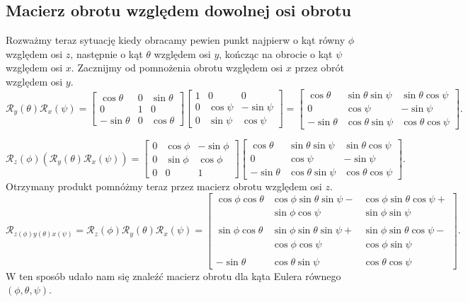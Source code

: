\documentclass[a4paper,twoside,11pt,reqno]{mwrep}
\theoremstyle{plain} \newtheorem{twr}{Twierdzenie}
\theoremstyle{plain} \newtheorem{lem}{Lemat}
\theoremstyle{definition} \newtheorem{defi}{Definicja}
\theoremstyle{remark} \newtheorem*{wni}{Wniosek}
\theoremstyle{definition} \newtheorem{uwaga}{Uwaga}
\theoremstyle{definition}\newtheorem{prz}{Przykład}
\begin{document}
\subsection{Macierz obrotu względem dowolnej osi obrotu}
Rozważmy teraz sytuację kiedy obracamy pewien punkt
najpierw o kąt równy $\phi$ względem osi $z$, następnie o kąt $\theta$ względem
osi $y$, kończąc na obrocie o kąt $\psi$ względem osi $x$.
Zacznijmy od pomnożenia obrotu względem osi $x$ przez obrót względem osi $y$.
$$
\mathcal{R}_y(\theta)\mathcal{R}_x(\psi)=\begin{bmatrix}
\cos\theta&0&\sin\theta\\
0&1   & 0\\
-\sin\theta &0 & \cos\theta
\end{bmatrix}
\begin{bmatrix}
 1&0&0\\
0&\cos\psi   & -\sin\psi\\
0&\sin\psi & \cos\psi
\end{bmatrix}=
\begin{bmatrix}
\cos\theta&\sin\theta\sin\psi&\sin\theta\cos\psi\\
0&\cos\psi   & -\sin\psi\\
-\sin\theta &\cos\theta\sin\psi & \cos\theta\cos\psi
\end{bmatrix}.
$$

$$
\mathcal{R}_z(\phi)(\mathcal{R}_y(\theta)\mathcal{R}_x(\psi)) = 
\begin{bmatrix}
0&\cos\phi   & -\sin\phi\\
0&\sin\phi & \cos\phi\\
0&0&1
\end{bmatrix}
\begin{bmatrix}
\cos\theta&\sin\theta\sin\psi&\sin\theta\cos\psi\\
0&\cos\psi   & -\sin\psi\\
-\sin\theta &\cos\theta\sin\psi & \cos\theta\cos\psi
\end{bmatrix}.
$$ 
Otrzymany produkt pomnóżmy teraz przez macierz obrotu względem osi $z$.
$$\mathcal{R}_{z(\phi)y(\theta)x(\psi)} = \mathcal{R}_z(\phi)\mathcal{R}_y(\theta)\mathcal{R}_x(\psi) = \begin{bmatrix}
\cos\phi\cos\theta& \cos\phi\sin\theta\sin\psi -& \cos\phi\sin\theta\cos\psi + \\
& \sin\phi \cos\psi &\sin\phi \sin\psi\\
&&\\
\sin\phi\cos\theta&\sin\phi\sin\theta\sin\psi+   & \sin\phi\sin\theta\cos\psi- \\
&\cos\phi\cos\psi&\cos\phi \sin\psi\\
&&\\
-\sin\theta &\cos\theta\sin\psi & \cos\theta\cos\psi
\end{bmatrix}.$$
W ten sposób udało nam się znaleźć macierz obrotu dla kąta Eulera równego $(\phi,\theta,\psi).$
\end{document}
